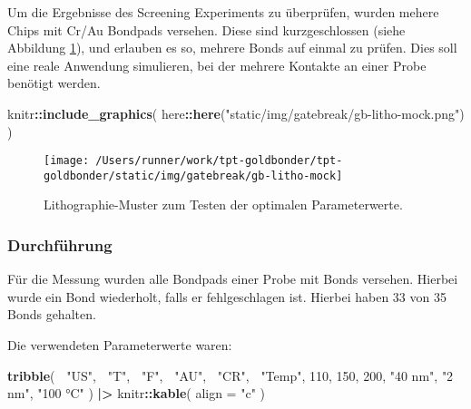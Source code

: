 \documentclass[
  paper=a4,
  ,captions=tableheading
]{scrartcl}
\newenvironment{Shaded}{\begin{snugshade}}{\end{snugshade}}
\newcommand{\DataTypeTok}[1]{\textcolor[rgb]{0.13,0.29,0.53}{#1}}
\newcommand{\DecValTok}[1]{\textcolor[rgb]{0.00,0.00,0.81}{#1}}
\newcommand{\ErrorTok}[1]{\textcolor[rgb]{0.64,0.00,0.00}{\textbf{#1}}}
\newcommand{\KeywordTok}[1]{\textcolor[rgb]{0.13,0.29,0.53}{\textbf{#1}}}
\newcommand{\NormalTok}[1]{#1}
\newcommand{\OperatorTok}[1]{\textcolor[rgb]{0.81,0.36,0.00}{\textbf{#1}}}
\newcommand{\StringTok}[1]{\textcolor[rgb]{0.31,0.60,0.02}{#1}}
\begin{document}
Um die Ergebnisse des Screening Experiments zu überprüfen, wurden mehere Chips mit Cr/Au Bondpads versehen. Diese sind kurzgeschlossen (siehe Abbildung \ref{fig:mock-image}), und erlauben es so, mehrere Bonds auf einmal zu prüfen. Dies soll eine reale Anwendung simulieren, bei der mehrere Kontakte an einer Probe benötigt werden.

\begin{Shaded}
\begin{Highlighting}[]
\NormalTok{knitr}\OperatorTok{::}\KeywordTok{include_graphics}\NormalTok{(}
\NormalTok{  here}\OperatorTok{::}\KeywordTok{here}\NormalTok{(}\StringTok{"static/img/gatebreak/gb-litho-mock.png"}\NormalTok{)}
\NormalTok{)}
\end{Highlighting}
\end{Shaded}

\begin{figure}

{\centering \texttt{[image: /Users/runner/work/tpt-goldbonder/tpt-goldbonder/static/img/gatebreak/gb-litho-mock]} 

}

\caption{Lithographie-Muster zum Testen der optimalen Parameterwerte.}\label{fig:mock-image}
\end{figure}

\hypertarget{durchfuxfchrung-1}{%
\subsubsection{Durchführung}\label{durchfuxfchrung-1}}

Für die Messung wurden alle Bondpads einer Probe mit Bonds versehen. Hierbei wurde ein Bond wiederholt, falls er fehlgeschlagen ist. Hierbei haben 33 von 35 Bonds gehalten.

Die verwendeten Parameterwerte waren:

\begin{Shaded}
\begin{Highlighting}[]
\KeywordTok{tribble}\NormalTok{(}
  \OperatorTok{~}\StringTok{"US"}\NormalTok{, }\OperatorTok{~}\StringTok{"T"}\NormalTok{, }\OperatorTok{~}\StringTok{"F"}\NormalTok{, }\OperatorTok{~}\StringTok{"AU"}\NormalTok{, }\OperatorTok{~}\StringTok{"CR"}\NormalTok{, }\OperatorTok{~}\StringTok{"Temp"}\NormalTok{,}
    \DecValTok{110}\NormalTok{, }\DecValTok{150}\NormalTok{, }\DecValTok{200}\NormalTok{, }\StringTok{"40 nm"}\NormalTok{, }\StringTok{"2 nm"}\NormalTok{, }\StringTok{"100 °C"}
\NormalTok{) }\OperatorTok{|}\ErrorTok{>}\StringTok{ }
\StringTok{  }\NormalTok{knitr}\OperatorTok{::}\KeywordTok{kable}\NormalTok{(}
    \DataTypeTok{align =} \StringTok{"c"}
\NormalTok{  )}
\end{Highlighting}
\end{Shaded}
\end{document}
